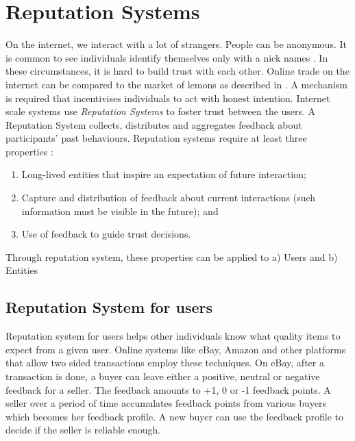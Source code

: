 \section{Reputation Systems}
\label{sec:reputation_systems}

On the internet, we interact with a lot of strangers. People can be anonymous. It is common to see individuals identify themselves only with a nick names \cite{Resnick2000}. In these circumstances, it is hard to build trust with each other. Online trade on the internet can be compared to the market of lemons as described in \cite{Akerlof1970}. A mechanism is required that incentivises individuals to act with honest intention. Internet scale systems use \textit{Reputation Systems} to foster trust between the users. A Reputation System collects, distributes and aggregates feedback about participants' past behaviours. Reputation systems require at least three properties \cite{Resnick2000}:

\begin{enumerate}
  \item Long-lived entities that inspire an expectation of future interaction;
  \item Capture and distribution of feedback about current interactions (such information must be visible in the future); and
  \item Use of feedback to guide trust decisions.
\end{enumerate}

Through reputation system, these properties can be applied to a) Users and b) Entities

\subsection{Reputation System for users}

Reputation system for users helps other individuals know what quality items to expect from a given user. Online systems like eBay, Amazon and other platforms that allow two sided transactions employ these techniques. On eBay, after a transaction is done, a buyer can leave either a positive, neutral or negative feedback for a seller. The feedback amounts to +1, 0 or -1 feedback points. A seller over a period of time accumulates feedback points from various buyers which becomes her feedback profile. A new buyer can use the feedback profile to decide if the seller is reliable enough.

